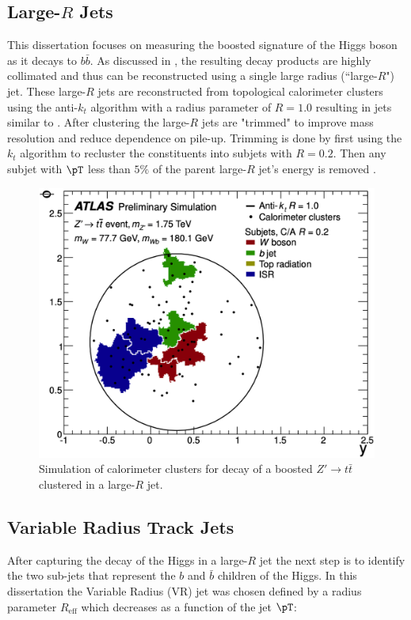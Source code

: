 \subsection{Large-$R$ Jets} \label{sec:objects:fatjet}
This dissertation focuses on measuring the boosted signature of the Higgs boson
as it decays to $b\bar{b}$.  As discussed in , the
resulting decay products are highly collimated and thus can be reconstructed
using a single large radius (``large-$R$") jet.  These large-$R$ jets are
reconstructed from topological calorimeter clusters using the anti-$k_{t}$
algorithm with a radius parameter of $R = 1.0$ resulting in jets similar to
 \cite{Aaboud:2018kfi, Aaboud:2017hdf}. After
clustering the large-$R$ jets are "trimmed" to improve mass resolution and
reduce dependence on pile-up. Trimming is done by first using the $k_{t}$
algorithm to recluster the constituents into subjets with $R=0.2$.  Then any
subjet with $\pT$ less than $5\%$ of the parent large-$R$ jet's energy is
removed \cite{Krohn:2009th}.

\begin{figure}[!htbp]
  \centering
  \includegraphics[width=0.7\linewidth]{figures/objects/large_R_example}
  \caption{\cite{ATLAS-CONF-2014-003} Simulation of calorimeter clusters for decay of a boosted $Z' \rightarrow t\bar{t}$ clustered in a large-$R$ jet.}
  \label{sec:object:large_R_example}
\end{figure}

\subsection{Variable Radius Track Jets} \label {sec:objects:vrjets}

After capturing the decay of the Higgs in a large-$R$ jet the next step is to
identify the two sub-jets that represent the $b$ and $\bar{b}$ children of the
Higgs. In this dissertation the Variable Radius (VR) jet was chosen
\cite{Krohn:2009zg,ATL-PHYS-PUB-2017-010} defined by a radius parameter
$R_{\text{eff}}$ which decreases as a function of the jet $\pT$:

